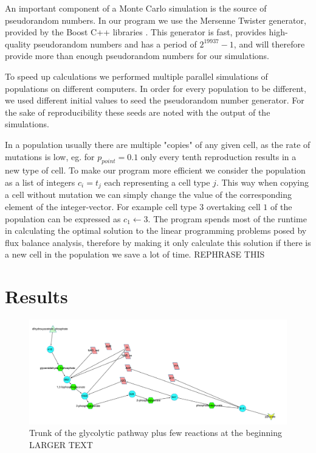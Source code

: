 \documentclass[a4paper,12pt]{article}
\begin{document}
	An important component of a Monte Carlo simulation is the source of pseudorandom numbers. In our program we use the Mersenne Twister \cite{mersennetwister} generator, provided by the Boost C++ libraries \cite{boostlibraries}. This generator is fast, provides high-quality pseudorandom numbers and has a period of $2^{19937}-1$, and will therefore provide more than enough pseudorandom numbers for our simulations.

	To speed up calculations we performed multiple parallel simulations of populations on different computers. In order for every population to be different, we used different initial values to seed the pseudorandom number generator. For the sake of reproducibility these seeds are noted with the output of the simulations. 

In a population usually there are multiple "copies" of any given cell, as the rate of mutations is low, eg. for $p_{point}=0.1$ only every tenth reproduction results in a new type of cell. To make our program more efficient we consider the population as a list of integers $c_i=t_j$ each representing a cell type $j$. This way when copying a cell without mutation we can simply change the value of the corresponding element of the integer-vector. For example cell type $3$ overtaking cell $1$ of the population can be expressed as $c_1 \leftarrow 3$.  The program spends most of the runtime in calculating the optimal solution to the linear programming problems posed by flux balance analysis, therefore by making it only calculate this solution if there is a new cell in the population we save a lot of time.  REPHRASE THIS

\section{Results}
\label{sec:results}

\begin{figure}[htpb]
	\centering
	\includegraphics[width=1\linewidth]{trunk_glyc_init.pdf}
	\caption{Trunk of the glycolytic pathway plus few reactions at the beginning LARGER TEXT}
	\label{fig:truncglycinit}
\end{figure}
\end{document}

